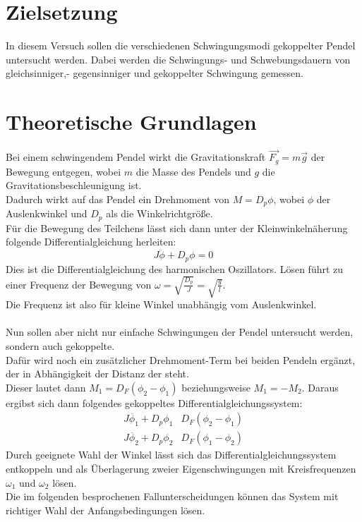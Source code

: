 \section{Zielsetzung}

In diesem Versuch sollen die verschiedenen Schwingungsmodi gekoppelter Pendel untersucht werden.
Dabei werden die Schwingungs- und Schwebungsdauern von gleichsinniger,- gegensinniger und gekoppelter Schwingung gemessen.

\section{Theoretische Grundlagen}

Bei einem schwingendem Pendel wirkt die Gravitationskraft $\vec{F_g}=m \vec{g} $ der Bewegung entgegen, wobei $m$ die Masse des Pendels und $g$ die Gravitationsbeschleunigung ist.\\
Dadurch wirkt auf das Pendel ein Drehmoment von $M= D_p\phi$, wobei $\phi$ der Auslenkwinkel und $D_p$ als die Winkelrichtgröße.\\
Für die Bewegung des Teilchens lässt sich dann unter der Kleinwinkelnäherung folgende Differentialgleichung herleiten:
\begin{equation*}
    J \ddot{\phi} + D_p \phi=0
\end{equation*}
Dies ist die Differentialgleichung des harmonischen Oszillators. Lösen führt zu einer Frequenz der Bewegung von $\omega= \sqrt{\frac{D_p}{J}}=\sqrt{\frac{g}{l}}$.\\
Die Frequenz ist also für kleine Winkel unabhängig vom Auslenkwinkel.\\\\

\noindent
Nun sollen aber nicht nur einfache Schwingungen der Pendel untersucht werden, sondern auch gekoppelte.\\
Dafür wird noch ein zusätzlicher Drehmoment-Term bei beiden Pendeln ergänzt, der in Abhängigkeit der Distanz der steht.\\
Dieser lautet dann $M_1=D_F (\phi_2 -\phi_1)$ beziehungsweise $M_1=-M_2$.
Daraus ergibst sich dann folgendes gekoppeltes Differentialgleichungssystem:
\begin{align*}
    J \ddot{\phi_1} + D_p \phi_1 & D_F (\phi_2 -\phi_1)\\
    J \ddot{\phi_2} + D_p \phi_2 & D_F (\phi_1 -\phi_2)
\end{align*}
Durch geeignete Wahl der Winkel lässt sich das Differentialgleichungssystem entkoppeln und als Überlagerung zweier Eigenschwingungen mit Kreisfrequenzen $\omega_1$ und $\omega_2$ lösen.\\
Die im folgenden besprochenen Fallunterscheidungen können das System mit richtiger Wahl der Anfangsbedingungen lösen.

